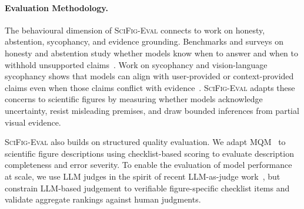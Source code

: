 \paragraph{Evaluation Methodology.}
The behavioural dimension of \textsc{SciFig-Eval} connects to work on honesty, abstention, sycophancy, and evidence grounding. Benchmarks and surveys on honesty and abstention study whether models know when to answer and when to withhold unsupported claims~\citep{chern2024behonest,wen2024knowlimits,wei2024simpleqa,ren2024selective}. Work on sycophancy and vision-language sycophancy shows that models can align with user-provided or context-provided claims even when those claims conflict with evidence~\citep{sharma2024sycophancy,fanous2025syceval}. \textsc{SciFig-Eval} adapts these concerns to scientific figures by measuring whether models acknowledge uncertainty, resist misleading premises, and draw bounded inferences from partial visual evidence.

\textsc{SciFig-Eval} also builds on structured quality evaluation. We adapt MQM~\citep{lommel2014multidimensional,freitag2021experts} to scientific figure descriptions using checklist-based scoring to evaluate description completeness and error severity.
To enable the evaluation of model performance at scale, we use LLM judges in the spirit of recent LLM-as-judge work~\citep{zheng2023judging}, but constrain LLM-based judgement to verifiable figure-specific checklist items and validate aggregate rankings against human judgments.
